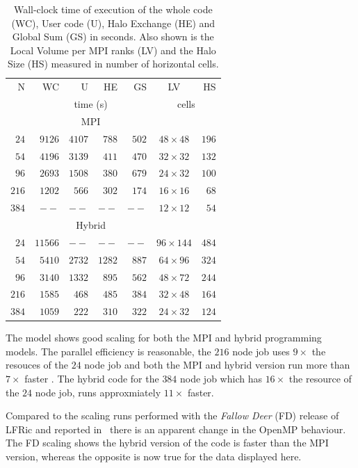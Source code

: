 \begin{table}
\centering
\caption{\label{tab:scale-data}Wall-clock time of execution of the whole code (WC), User
  code (U), Halo Exchange (HE) and Global Sum (GS) in seconds. Also
  shown is the Local Volume per MPI ranks (LV) and the Halo Size (HS)
  measured in number of horizontal cells.}
\begin{tabular}{r|rrrr|cr}
N & WC & U & HE & GS & LV & HS  \\
    & \multicolumn{4}{c|}{time (s)} & \multicolumn{2}{c}{cells} \\ \hline\hline
     &  \multicolumn{4}{c|}{MPI}& \\
$24$  & $9126$ & $4107$ & $788$ & $502$ & $48\times 48$ & $196$ \\
$54$  & $4196$ & $3139$ & $411$ & $470$ & $32\times 32$ & $132$ \\ 
$96$  & $2693$ & $1508$ & $380$ & $679$ & $24\times 32$ & $100$ \\ 
$216$ & $1202$ & $566$  & $302$ & $174$ & $16\times 16$ & $68$  \\ 
$384$ & $--$   & $--$   & $--$  & $--$  & $12\times 12$ & $54$ \\\hline
  & \multicolumn{4}{c|}{Hybrid} & \\
$24$ &$11566$ & $--$    & $--$  & $--$ & $96\times 144$ & $484$ \\
$54$ & $5410$  & $2732$ & $1282$ & $887$ & $64\times 96$ & $324$ \\
$96$ &$3140$  & $1332$ & $895$ & $562$ & $48\times 72$ & $244$ \\
$216$ &$1585$  & $468$ & $485$ & $384$ & $32\times 48$ & $164$ \\
$384$ &$1059$  & $222$ & $310$ & $322$ & $24\times 32$ & $124$ \\\hline
\end{tabular}
\end{table}

The model shows good scaling for both the MPI and hybrid programming
models. The parallel efficiency is reasonable, the $216$ node job uses
$9\times $ the resouces of the $24$ node job and both the MPI and
hybrid version run more than $7\times $ faster . The hybrid code for the
$384$ node job which has $16\times $ the resource of the $24$ node
job, runs approxmiately $11 \times$ faster.

Compared to the scaling runs performed with the {\em Fallow Deer} (FD)
release of LFRic and reported in~\cite{lfric} there is an apparent
change in the OpenMP behaviour. The FD scaling shows the hybrid version of
the code is faster than the MPI version, whereas the opposite is now
true for the data displayed here. 


